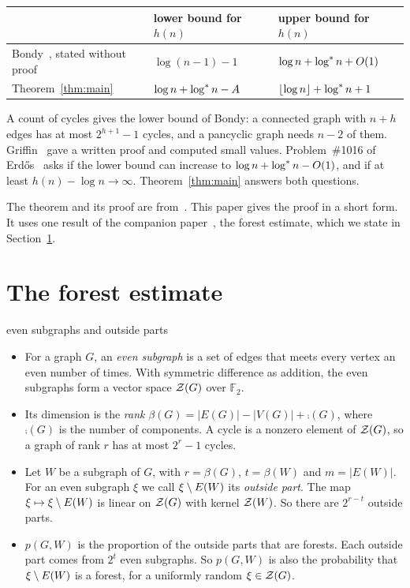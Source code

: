 \documentclass[11pt]{article}
\begin{document}
\begin{center}\small
\begin{tabular}{@{}p{5.4cm}p{3.9cm}p{4.3cm}@{}}
\toprule
 & \textsf{\textbf{lower bound for $h(n)$}} & \textsf{\textbf{upper bound for $h(n)$}}\\
\midrule
Bondy~\cite{Bondy}, stated without proof & $\log(n-1)-1$ & $\log n+\log^{*} n+O(1)$\\
Theorem~\ref{thm:main} & $\log n+\log^{*} n-A$ & $\lfloor\log n\rfloor+\log^{*} n+1$\\
\bottomrule
\end{tabular}
\end{center}

A count of cycles gives the lower bound of Bondy: a connected graph with $n+h$ edges has at most
$2^{h+1}-1$ cycles, and a pancyclic graph needs $n-2$ of them. Griffin~\cite{Griffin} gave a
written proof and computed small values. Problem~\#1016 of Erd\H{o}s~\cite{Bloom} asks if the
lower bound can increase to $\log n+\log^{*} n-O(1)$, and if at least $h(n)-\log n\to\infty$.
Theorem~\ref{thm:main} answers both questions.

The theorem and its proof are from~\cite{KNT}. This paper gives the proof in a short form. It
uses one result of the companion paper~\cite{Forest}, the forest estimate, which we state in
Section~\ref{sec:input}.

\section{The forest estimate}\label{sec:input}

\begin{notation}{even subgraphs and outside parts}
\begin{itemize}[leftmargin=1.2em]
\item For a graph $G$, an \emph{even subgraph} is a set of edges that meets every vertex an even
number of times. With symmetric difference as addition, the even subgraphs form a vector space
$\mathcal{Z}(G)$ over $\mathbb{F}_2$.
\item Its dimension is the \emph{rank} $\beta(G)=|E(G)|-|V(G)|+\comp(G)$, where $\comp(G)$ is the
number of components. A cycle is a nonzero element of $\mathcal{Z}(G)$, so a graph of rank $r$ has at most
$2^{r}-1$ cycles.
\item Let $W$ be a subgraph of $G$, with $r=\beta(G)$, $t=\beta(W)$ and $m=|E(W)|$. For an even
subgraph $\xi$ we call $\xi\setminus E(W)$ its \emph{outside part}. The map $\xi\mapsto\xi\setminus E(W)$ is
linear on $\mathcal{Z}(G)$ with kernel $\mathcal{Z}(W)$. So there are $2^{r-t}$ outside parts.
\item $p(G,W)$ is the proportion of the outside parts that are forests. Each outside part
comes from $2^{t}$ even subgraphs. So $p(G,W)$ is also the probability that $\xi\setminus E(W)$ is a
forest, for a uniformly random $\xi\in\mathcal{Z}(G)$.
\end{itemize}
\end{notation}
\end{document}
